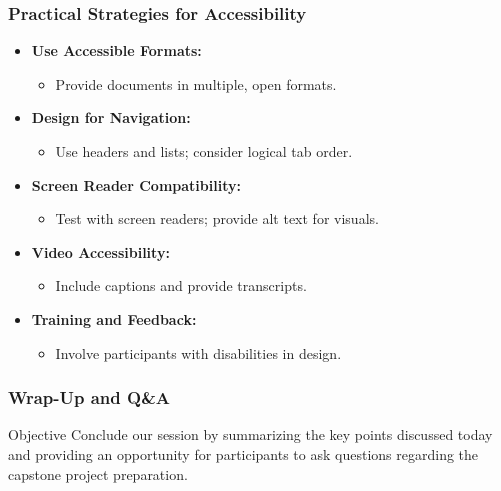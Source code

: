 \documentclass[aspectratio=169]{beamer}
\begin{document}
\begin{frame}[fragile]
    \frametitle{Practical Strategies for Accessibility}
    \begin{itemize}
        \item \textbf{Use Accessible Formats:}
            \begin{itemize}
                \item Provide documents in multiple, open formats.
            \end{itemize}
        \item \textbf{Design for Navigation:}
            \begin{itemize}
                \item Use headers and lists; consider logical tab order.
            \end{itemize}
        \item \textbf{Screen Reader Compatibility:}
            \begin{itemize}
                \item Test with screen readers; provide alt text for visuals.
            \end{itemize}
        \item \textbf{Video Accessibility:}
            \begin{itemize}
                \item Include captions and provide transcripts.
            \end{itemize}
        \item \textbf{Training and Feedback:}
            \begin{itemize}
                \item Involve participants with disabilities in design.
            \end{itemize}
    \end{itemize}
\end{frame}

\begin{frame}[fragile]
    \frametitle{Wrap-Up and Q\&A}
    \begin{block}{Objective}
        Conclude our session by summarizing the key points discussed today and providing an opportunity for participants to ask questions regarding the capstone project preparation.
    \end{block}
\end{frame}
\end{document}
